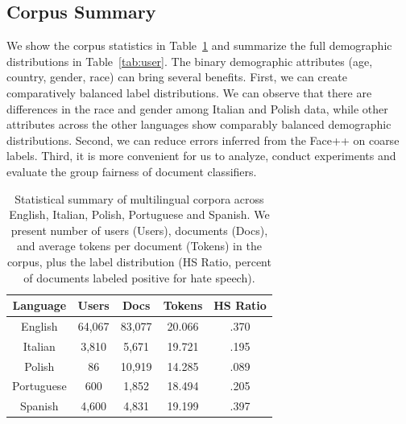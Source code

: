 \subsection{Corpus Summary} 

We show the corpus statistics in Table~\ref{tab:corpus} and summarize the full demographic distributions in Table~\ref{tab:user}. 
The binary demographic attributes (age, country, gender, race) can bring several benefits. 
First, we can create comparatively balanced label distributions. 
We can observe that there are differences in the race and gender among Italian and Polish data, while other attributes across the other languages show comparably balanced demographic distributions.
Second, we can reduce errors inferred from the Face++ on coarse labels.
Third, it is more convenient for us to analyze, conduct experiments and evaluate the group fairness of document classifiers.

\begin{table}[htp]
\centering
\begin{tabular}{c||cccc}
Language & Users & Docs & Tokens & HS Ratio \\\hline\hline
English & 64,067 & 83,077 & 20.066 & .370 \\
Italian & 3,810 & 5,671 & 19.721 & .195 \\
Polish & 86 & 10,919 & 14.285 & .089 \\
Portuguese & 600 & 1,852 & 18.494 & .205 \\
Spanish & 4,600 & 4,831 & 19.199 & .397
\end{tabular}
\caption{Statistical summary of multilingual corpora across English, Italian, Polish, Portuguese and Spanish. We present number of users (Users), documents (Docs), and average tokens per document (Tokens) in the corpus, 
plus the label distribution (HS Ratio, percent of documents labeled positive for hate speech).}
\label{tab:corpus}
\end{table}


